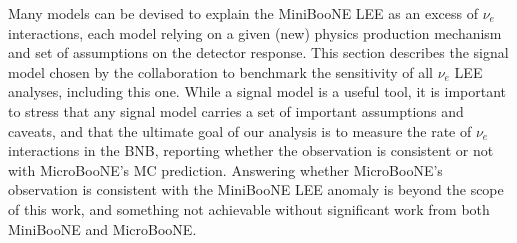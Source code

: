 \par  Many models can be devised to explain the MiniBooNE LEE as an excess of $\nu_e$ interactions, each model relying on a given (new) physics production mechanism and set of assumptions on the detector response. This section describes the signal model chosen by the collaboration to benchmark the sensitivity of all $\nu_e$ LEE analyses, including this one.  While a signal model is a useful tool, it is important to stress that any signal model carries a set of important assumptions and caveats, and that the ultimate goal of our analysis is to measure the rate of $\nu_e$ interactions in the BNB, reporting whether the observation is consistent or not with MicroBooNE's MC prediction. Answering whether MicroBooNE's observation is consistent with the MiniBooNE LEE anomaly is beyond the scope of this work, and something not achievable without significant work from both MiniBooNE and MicroBooNE.

